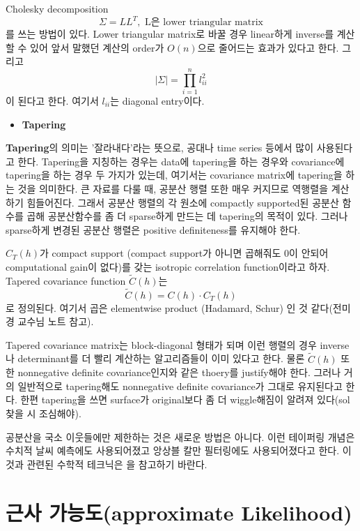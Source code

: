 \documentclass[b5paper,]{scrbook}
\providecommand{\tightlist}{%
  \setlength{\itemsep}{0pt}\setlength{\parskip}{0pt}}
\theoremstyle{plain}
\theoremstyle{definition}
\numberwithin{equation}{section}
\begin{document}
Cholesky decomposition
\[\Sigma=LL^{T}, \text{ L은 lower triangular matrix}\]
를 쓰는 방법이 있다. Lower triangular matrix로 바꿀 경우 linear하게 inverse를 계산할 수 있어 앞서 말했던 계산의 order가 \(O(n)\)으로 줄어드는 효과가 있다고 한다. 그리고
\[|\Sigma | = \prod_{i=1}^{n}l_{ii}^{2}\]
이 된다고 한다. 여기서 \(l_{ii}\)는 diagonal entry이다.

\begin{itemize}
\tightlist
\item
  \textbf{Tapering}
\end{itemize}

\textbf{Tapering}의 의미는 '잘라내다'라는 뜻으로, 공대나 time series 등에서 많이 사용된다고 한다. Tapering을 지칭하는 경우는 data에 tapering을 하는 경우와 covariance에 tapering을 하는 경우 두 가지가 있는데, 여기서는 covariance matrix에 tapering을 하는 것을 의미한다. 큰 자료를 다룰 때, 공분산 행렬 또한 매우 커지므로 역행렬을 계산하기 힘들어진다. 그래서 공분산 행렬의 각 원소에 compactly supported된 공분산 함수를 곱해 공분산함수를 좀 더 sparse하게 만드는 데 tapering의 목적이 있다. 그러나 sparse하게 변경된 공분산 행렬은 positive definiteness를 유지해야 한다.

\(C_{T}(h)\)가 compact support (compact support가 아니면 곱해줘도 0이 안되어 computational gain이 없다)를 갖는 isotropic correlation function이라고 하자. Tapered covariance function \(\tilde{C}(h)\)는
\[\tilde{C}(h)=C(h)\cdot C_{T}(h)\]
로 정의된다. 여기서 곱은 elementwise product (Hadamard, Schur) 인 것 같다(전미경 교수님 노트 참고).

Tapered covariance matrix는 block-diagonal 형태가 되며 이런 행렬의 경우 inverse나 determinant를 더 빨리 계산하는 알고리즘들이 이미 있다고 한다. 물론 \(\tilde{C}(h)\) 또한 nonnegative definite covariance인지와 같은 thoery를 justify해야 한다. 그러나 거의 일반적으로 tapering해도 nonnegative definite covariance가 그대로 유지된다고 한다. 한편 tapering을 쓰면 surface가 original보다 좀 더 wiggle해짐이 알려져 있다(sol 찾을 시 조심해야).

공분산을 국소 이웃들에만 제한하는 것은 새로운 방법은 아니다. 이런 테이퍼링 개념은 수치적 날씨 예측에도 사용되어졌고 앙상블 칼만 필터링에도 사용되어졌다고 한다. 이것과 관련된 수학적 테크닉은 \citep{Kaufman2008}을 참고하기 바란다.

\hypertarget{-approximate-likelihood}{%
\section{근사 가능도(approximate Likelihood)}\label{-approximate-likelihood}}
\end{document}
